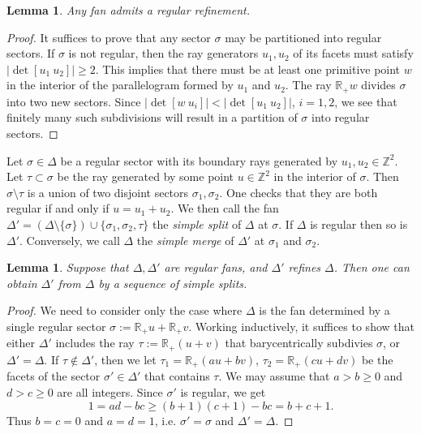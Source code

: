 \documentclass[11pt]{amsart}
\theoremstyle{definition}
\theoremstyle{plain}
\newtheorem{lem}[thm]{Lemma}
\theoremstyle{remark}
\numberwithin{equation}{section}
\def\R{\mathbb{R}}
\def\Z{\mathbb{Z}}
\def\fan{\Delta}
\begin{document}
\begin{lem}
\label{lem:regularization}
Any fan admits a regular refinement.
\end{lem}

\begin{proof}
It suffices to prove that any sector $\sigma$ may be partitioned into regular sectors.
If $\sigma$ is not regular, then the ray generators $u_1,u_2$ of its facets must satisfy $|\det[u_1\ u_2]|\ge 2$.
This implies that there must be at least one primitive point $w$ in the interior of the parallelogram formed by $u_1$ and $u_2$.
The ray $\R_+ w$ divides $\sigma$ into two new sectors.  Since $|\det[w\ u_i]| < |\det[u_1\ u_2]|$, $i=1,2$, we see that finitely many 
such subdivisions will result in a partition of $\sigma$ into regular sectors.
\end{proof}

Let $\sigma\in\fan$ be a regular sector with its boundary rays generated by $u_1,u_2\in\Z^2$.  Let $\tau\subset \sigma$ be the ray generated by some point $u\in\Z^2$ in the interior of $\sigma$.  Then $\sigma\setminus\tau$ is a union of two disjoint sectors $\sigma_1,\sigma_2$. One checks that they are both regular if and only if $u=u_1+u_2$.  We then call the fan 
$\fan'=(\fan\setminus\{\sigma\})\cup\{\sigma_1,\sigma_2,\tau\}$ the {\em simple split}
of $\fan$ at $\sigma$. If $\fan$ is regular then so is $\fan'$.  Conversely, we call $\Delta$ the {\em simple merge} of $\Delta'$ at $\sigma_1$ and $\sigma_2$.

\begin{lem}
\label{lem:regular_refinement}
Suppose that $\fan,\fan'$ are regular fans, and $\fan'$ refines $\fan$. Then one can obtain
$\fan'$ from $\fan$ by a sequence of simple splits.
\end{lem}

\begin{proof}
We need to consider only the case where $\fan$ is the fan determined by a single regular sector $\sigma := \R_+ u + \R_+ v$.  Working inductively, it suffices to show that either $\fan'$ includes the ray 
$\tau := \R_+ (u+v)$ that barycentrically subdivies $\sigma$, or $\Delta' = \Delta$.  If $\tau \notin \Delta'$, then we let $\tau_1 = \R_+(au + bv)$, 
$\tau_2 = \R_+(cu + dv)$ be the facets of the sector $\sigma' \in \Delta'$ that contains $\tau$.  We may assume that $a > b\geq 0$ and $d> c\geq 0$ are all integers.  Since $\sigma'$ is regular, we get
$$
1 = ad-bc \geq (b+1)(c+1) - bc = b+c+1.
$$
Thus $b=c = 0$ and $a=d=1$, i.e. $\sigma' = \sigma$ and $\fan' = \fan$.
\end{proof}
\end{document}
